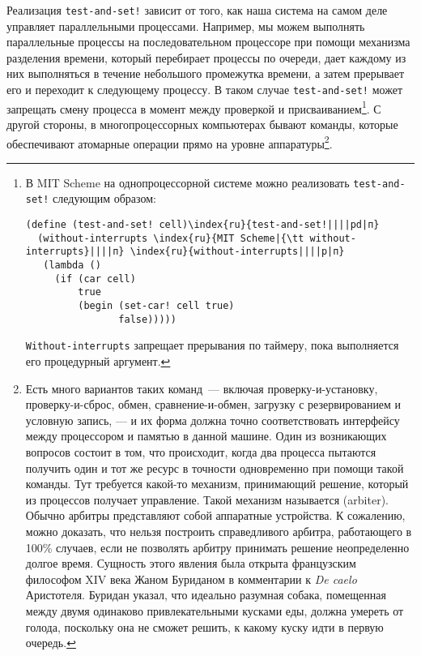 Реализация {\tt test-and-set!} зависит от того,
как наша система на самом деле управляет параллельными процессами.
Например, мы можем выполнять параллельные процессы на последовательном
процессоре при помощи механизма
%
разделения времени, который перебирает
процессы по очереди, дает каждому из них выполняться в течение
небольшого промежутка времени, а затем прерывает его и переходит к
следующему процессу.  В таком случае {\tt test-and-set!} может
запрещать смену процесса в момент между проверкой и
присваиванием\footnote{В MIT Scheme на однопроцессорной системе можно реализовать
{\tt test-and-set!} следующим образом:

\begin{Verbatim}
(define (test-and-set! cell)\index{ru}{test-and-set!||||pd|п}
  (without-interrupts \index{ru}{MIT Scheme|{\tt without-interrupts}||||п} \index{ru}{without-interrupts||||p|п}
   (lambda ()
     (if (car cell)
         true
         (begin (set-car! cell true)
                false)))))
\end{Verbatim}
{\tt Without-interrupts} запрещает прерывания по таймеру, пока
выполняется его процедурный аргумент.
}.
С другой стороны, в многопроцессорных компьютерах бывают команды,
которые обеспечивают %
атомарные операции прямо на уровне аппаратуры\footnote{Есть много вариантов таких команд~--- включая
проверку-и-установку, проверку-и-сброс, обмен, сравнение-и-обмен,
загрузку с резервированием и условную запись, --- и их форма должна
точно соответствовать интерфейсу между процессором и памятью в данной
машине.  Один из возникающих вопросов состоит в том, что происходит,
когда два процесса пытаются получить один и тот же ресурс в точности
одновременно при помощи такой команды.  Тут требуется какой-то
механизм, принимающий решение, который из процессов получает
управление.  Такой механизм называется
 (arbiter).  Обычно арбитры представляют
собой аппаратные устройства.  К сожалению, можно доказать, что нельзя
построить справедливого арбитра, работающего в 100\% случаев, если не
позволять арбитру принимать решение неопределенно долгое время.
Сущность этого явления была открыта французским философом XIV века
Жаном Буриданом
в комментарии к
{\em De caelo} Аристотеля.
Буридан указал, что
идеально разумная собака, помещенная между двумя
одинаково привлекательными кусками еды, должна умереть от голода,
поскольку она не сможет решить, к какому куску идти в первую очередь.
}.
